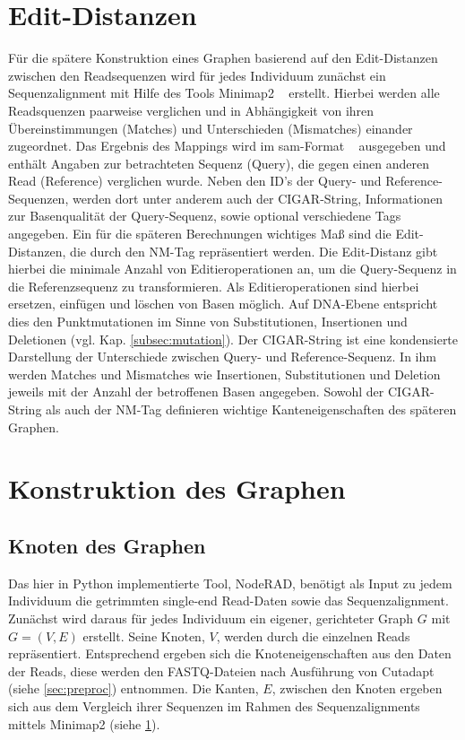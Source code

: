 \section{Edit-Distanzen} \label{sec:edit}
Für die spätere Konstruktion eines Graphen basierend auf den Edit-Distanzen zwischen den Readsequenzen wird für jedes Individuum zunächst ein Sequenzalignment mit Hilfe des Tools Minimap2 ~\cite{li_2018} erstellt. Hierbei werden alle Readsquenzen paarweise verglichen und in Abhängigkeit von ihren Übereinstimmungen (Matches) und Unterschieden (Mismatches) einander zugeordnet. Das Ergebnis des Mappings wird im sam-Format ~\cite{li_2009} ausgegeben und enthält Angaben zur betrachteten Sequenz (Query), die gegen einen anderen Read (Reference) verglichen wurde. Neben den ID's der Query- und Reference-Sequenzen, werden dort unter anderem auch der CIGAR-String, Informationen zur Basenqualität der Query-Sequenz, sowie optional verschiedene Tags angegeben. Ein für die späteren Berechnungen wichtiges Maß sind die Edit-Distanzen, die durch den NM-Tag repräsentiert werden. Die Edit-Distanz gibt hierbei die minimale Anzahl von Editieroperationen an, um die Query-Sequenz in die Referenzsequenz zu transformieren. Als Editieroperationen sind hierbei ersetzen, einfügen und löschen von Basen möglich. Auf DNA-Ebene entspricht dies den Punktmutationen im Sinne von Substitutionen, Insertionen und Deletionen (vgl. Kap. \ref{subsec:mutation}). Der CIGAR-String ist eine kondensierte Darstellung der Unterschiede zwischen Query- und Reference-Sequenz. In ihm werden Matches und Mismatches wie Insertionen, Substitutionen und Deletion jeweils mit der Anzahl der betroffenen Basen angegeben. Sowohl der CIGAR-String als auch der NM-Tag definieren wichtige Kanteneigenschaften des späteren Graphen. \\

\section{Konstruktion des Graphen} \label{sec:graph}
\subsection{Knoten des Graphen} \label{subsec:nodes}
Das hier in Python implementierte Tool, NodeRAD, benötigt als Input zu jedem Individuum die getrimmten single-end Read-Daten sowie das Sequenzalignment. Zunächst wird daraus für jedes Individuum ein eigener, gerichteter Graph $ G $ mit $ G = (V,E) $ erstellt. Seine Knoten, $ V $, werden durch die einzelnen Reads repräsentiert. Entsprechend ergeben sich die Knoteneigenschaften aus den Daten der Reads, diese werden den FASTQ-Dateien nach Ausführung von Cutadapt (siehe \ref{sec:preproc}) entnommen. Die Kanten, $ E $, zwischen den Knoten ergeben sich aus dem Vergleich ihrer Sequenzen im Rahmen des Sequenzalignments mittels Minimap2 (siehe \ref{sec:edit}).\\


